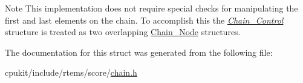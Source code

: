 \begin{DoxyNote}{Note}
This implementation does not require special checks for manipulating the first and last elements on the chain. To accomplish this the {\itshape \mbox{\hyperlink{unionChain__Control}{Chain\+\_\+\+Control}}} structure is treated as two overlapping \mbox{\hyperlink{group__RTEMSScoreChain_ga0dd4bfcca1ac7f90de2842e447846d3d}{Chain\+\_\+\+Node}} structures. 
\end{DoxyNote}


The documentation for this struct was generated from the following file\+:\begin{DoxyCompactItemize}
\item 
cpukit/include/rtems/score/\mbox{\hyperlink{score_2chain_8h}{chain.\+h}}\end{DoxyCompactItemize}
